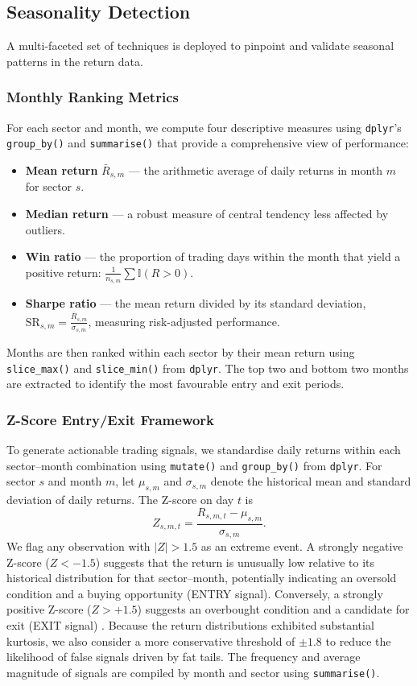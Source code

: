 \documentclass[12pt,a4paper,fleqn]{article}
\begin{document}
\subsection{Seasonality Detection}

A multi-faceted set of techniques is deployed to pinpoint and validate seasonal patterns in the return data.

\subsubsection{Monthly Ranking Metrics}

For each sector and month, we compute four descriptive measures using \texttt{dplyr}'s \texttt{group\_by()} and \texttt{summarise()} that provide a comprehensive view of performance:
\begin{itemize}
    \item \textbf{Mean return} \(\bar{R}_{s,m}\) — the arithmetic average of daily returns in month \(m\) for sector \(s\).
    \item \textbf{Median return} — a robust measure of central tendency less affected by outliers.
    \item \textbf{Win ratio} — the proportion of trading days within the month that yield a positive return: \(\frac{1}{n_{s,m}}\sum \mathbb{I}(R>0)\).
    \item \textbf{Sharpe ratio} \cite{sharpe1966mutual} — the mean return divided by its standard deviation, \(\text{SR}_{s,m} = \frac{\bar{R}_{s,m}}{\sigma_{s,m}}\), measuring risk-adjusted performance.
\end{itemize}
Months are then ranked within each sector by their mean return using \texttt{slice\_max()} and \texttt{slice\_min()} from \texttt{dplyr}. The top two and bottom two months are extracted to identify the most favourable entry and exit periods.

\subsubsection{Z-Score Entry/Exit Framework}

To generate actionable trading signals, we standardise daily returns within each sector–month combination using \texttt{mutate()} and \texttt{group\_by()} from \texttt{dplyr}. For sector \(s\) and month \(m\), let \(\mu_{s,m}\) and \(\sigma_{s,m}\) denote the historical mean and standard deviation of daily returns. The Z-score on day \(t\) is
\[
Z_{s,m,t} = \frac{R_{s,m,t} - \mu_{s,m}}{\sigma_{s,m}}.
\]
We flag any observation with \(|Z| > 1.5\) as an extreme event. A strongly negative Z-score (\(Z < -1.5\)) suggests that the return is unusually low relative to its historical distribution for that sector–month, potentially indicating an oversold condition and a buying opportunity (ENTRY signal). Conversely, a strongly positive Z-score (\(Z > +1.5\)) suggests an overbought condition and a candidate for exit (EXIT signal) \cite{tsay2010analysis}. Because the return distributions exhibited substantial kurtosis, we also consider a more conservative threshold of \(\pm 1.8\) to reduce the likelihood of false signals driven by fat tails. The frequency and average magnitude of signals are compiled by month and sector using \texttt{summarise()}.
\end{document}
